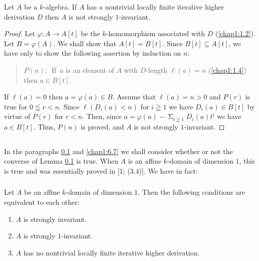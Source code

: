 \begin{lemma*}
Let $A$ be a $k$-algebra. If $A$ has a nontrivial locally finite
iterative higher derivation $D$ then $A$ is not strongly $1$-invariant.
\end{lemma*}

\begin{proof}
Let $\varphi:A\to A[t]$ be the $k$-homomorphism associated with $D$
(\cf \ref{chap1:1.2}). Let $B=\varphi(A)$. We shall show that
$A[t]=B[t]$. Since $B[t]\subseteq A[t]$, we have only to show the
following assertion by induction on $n$:
\begin{quote}
$P(n):$~If\pageoriginale\ $a$ is an element of $A$ with
  $D$-length $\ell(a)=n$ (\cf \ref{chap1:1.4}) then $a\in B[t]$.
\end{quote}
If $\ell(a)=0$ then $a=\varphi(a)\in B$. Assume that $\ell(a)=n>0$ and
$P(r)$ is true for $0\leqq r<n$. Since $\ell(D_{i}(a)<n)$ for $i\geqq
1$ we have $D_{i}(a)\in B[t]$ by virtue of $P(r)$ for $r<n$. Then,
since $a=\varphi(a)-{\displaystyle{\mathop{\Sigma}_{i\geqq
      1}}}D_{i}(a)t^{i}$ we have $a\in B[t]$. Thus, $P(n)$ is proved,
and $A$ is not strongly $1$-invariant.
\end{proof}

\subsection{}\label{chap1:6.6}
In the paragraphs \ref{chap1:6.6} and \ref{chap1:6.7} we shall consider whether or
not the converse of Lemma \ref{chap1:6.6} is true. When $A$ is an affine
$k$-domain of dimension $1$, this is true and was essentially proved
in [1; (3.4)]. We have in fact:

\subsubsection{}\label{chap1:6.6.1}
\begin{prop*}
  Let $A$ be an affine $k$-domain of dimension $1$. Then the following
  conditions are equivalent to each other:
  \begin{enumerate}
    \renewcommand{\labelenumi}{\rm(\theenumi)}
  \item $A$ is strongly invariant.
    
  \item $A$ is strongly $1$-invariant.
    
  \item $A$ has no nontrivial locally finite iterative higher derivation.
  \end{enumerate}
\end{prop*}


